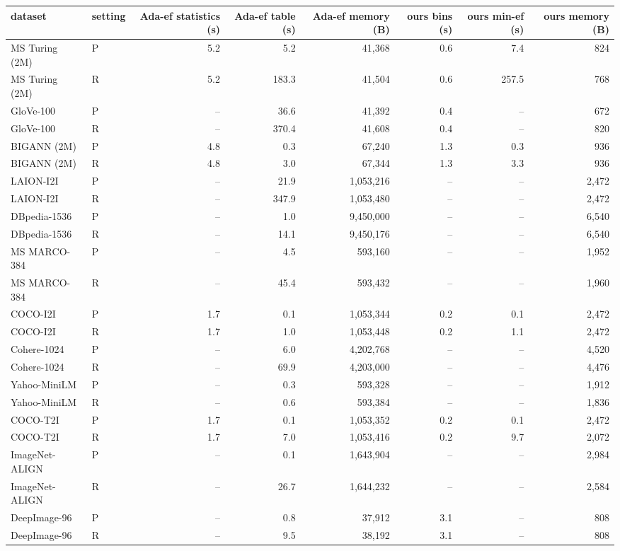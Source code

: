 \begin{tabular}{llrrrrrr}
\toprule
dataset & setting & Ada-ef statistics (s) & Ada-ef table (s) & Ada-ef memory (B) & ours bins (s) & ours min-ef (s) & ours memory (B) \\
\midrule
MS Turing (2M) & P & 5.2 & 5.2 & 41,368 & 0.6 & 7.4 & 824 \\
MS Turing (2M) & R & 5.2 & 183.3 & 41,504 & 0.6 & 257.5 & 768 \\
GloVe-100 & P & -- & 36.6 & 41,392 & 0.4 & -- & 672 \\
GloVe-100 & R & -- & 370.4 & 41,608 & 0.4 & -- & 820 \\
BIGANN (2M) & P & 4.8 & 0.3 & 67,240 & 1.3 & 0.3 & 936 \\
BIGANN (2M) & R & 4.8 & 3.0 & 67,344 & 1.3 & 3.3 & 936 \\
LAION-I2I & P & -- & 21.9 & 1,053,216 & -- & -- & 2,472 \\
LAION-I2I & R & -- & 347.9 & 1,053,480 & -- & -- & 2,472 \\
DBpedia-1536 & P & -- & 1.0 & 9,450,000 & -- & -- & 6,540 \\
DBpedia-1536 & R & -- & 14.1 & 9,450,176 & -- & -- & 6,540 \\
MS MARCO-384 & P & -- & 4.5 & 593,160 & -- & -- & 1,952 \\
MS MARCO-384 & R & -- & 45.4 & 593,432 & -- & -- & 1,960 \\
COCO-I2I & P & 1.7 & 0.1 & 1,053,344 & 0.2 & 0.1 & 2,472 \\
COCO-I2I & R & 1.7 & 1.0 & 1,053,448 & 0.2 & 1.1 & 2,472 \\
Cohere-1024 & P & -- & 6.0 & 4,202,768 & -- & -- & 4,520 \\
Cohere-1024 & R & -- & 69.9 & 4,203,000 & -- & -- & 4,476 \\
Yahoo-MiniLM & P & -- & 0.3 & 593,328 & -- & -- & 1,912 \\
Yahoo-MiniLM & R & -- & 0.6 & 593,384 & -- & -- & 1,836 \\
COCO-T2I & P & 1.7 & 0.1 & 1,053,352 & 0.2 & 0.1 & 2,472 \\
COCO-T2I & R & 1.7 & 7.0 & 1,053,416 & 0.2 & 9.7 & 2,072 \\
ImageNet-ALIGN & P & -- & 0.1 & 1,643,904 & -- & -- & 2,984 \\
ImageNet-ALIGN & R & -- & 26.7 & 1,644,232 & -- & -- & 2,584 \\
DeepImage-96 & P & -- & 0.8 & 37,912 & 3.1 & -- & 808 \\
DeepImage-96 & R & -- & 9.5 & 38,192 & 3.1 & -- & 808 \\

\end{tabular}
